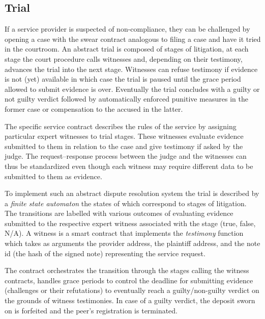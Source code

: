 \subsection{Trial}
\label{sec:swindle}

If a service provider is suspected of non-compliance, they can be challenged by opening a case with the swear contract analogous to filing a case and have it 
tried in the courtroom.
An abstract trial is composed of stages of litigation, at each stage the court procedure calls witnesses and, depending on their testimony, advances the trial into the next stage. Witnesses can refuse testimony if evidence is not (yet) available in which case the trial is paused until the grace period allowed to submit evidence is over. Eventually the trial concludes with a guilty or not guilty verdict followed by automatically enforced punitive measures in the former case or compensation to the accused in the latter.

The specific service contract describes the rules of the service by assigning particular expert witnesses to trial stages. These witnesses evaluate evidence submitted to them in relation to the case and give testimony if asked by the judge.
The request--response process between the judge and the witnesses can thus be standardized even though each witness may require different data to be submitted to them as evidence.

To implement such an abstract dispute resolution system the trial is described by a \emph{finite state automaton} the states of which correspond to stages of litigation. The transitions are labelled with various outcomes of evaluating evidence submitted to the respective expert witness associated with the stage (true, false, N/A). A witness is a smart contract that implements the \emph{testimony} function which takes as arguments the provider address, the plaintiff address, and the note id (the hash of the signed note) representing the service request.

The  contract orchestrates the transition through the stages calling the witness contracts, handles grace periods to control the deadline for submitting evidence (challenges or their refutations) to eventually reach a guilty/non-guilty verdict on the grounds of witness testimonies.
In case of a guilty verdict, the deposit sworn on is forfeited and the peer's registration is terminated. 

